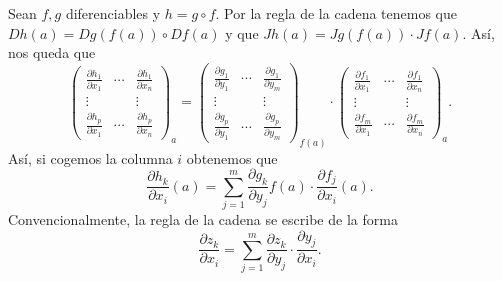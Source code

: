 \begin{observation}
Sean $\displaystyle f,g $ diferenciables y $\displaystyle h = g\circ f $. Por la regla de la cadena tenemos que $\displaystyle Dh\left(a\right)=Dg\left(f\left(a\right)\right)\circ Df\left(a\right) $ y que $\displaystyle Jh\left(a\right)=Jg\left(f\left(a\right)\right) \cdot Jf\left(a\right) $. Así, nos queda que
\[\begin{pmatrix} \frac{\partial h_{1}}{\partial x_{1}} & \cdots & \frac{\partial h_{1}}{\partial x_{n}} \\ \vdots & & \vdots \\ \frac{\partial h_{p}}{\partial x_{1}} & \cdots & \frac{\partial h_{p}}{\partial x_{n}} \end{pmatrix}_{a}= \begin{pmatrix} \frac{\partial g_{1}}{\partial y_{1}} & \cdots & \frac{\partial g_{1}}{\partial y_{m}} \\ \vdots & & \vdots \\ \frac{\partial g_{p}}{\partial y_{1}} & \cdots & \frac{\partial g_{p}}{\partial y_{m}} \end{pmatrix}_{f\left(a\right)}
\cdot \begin{pmatrix} \frac{\partial f_{1}}{\partial x_{1}} & \cdots & \frac{\partial f_{1}}{\partial x_{n}} \\ 
\vdots & & \vdots \\ 
\frac{\partial f_{m}}{\partial x_{1}} & \cdots & \frac{\partial f_{m}}{\partial x_{n}}\end{pmatrix}_{a}.\]
Así, si cogemos la columna $\displaystyle i $ obtenemos que 
\[\frac{\partial h_{k}}{\partial x_{i}}\left(a\right) = \sum^{m}_{j = 1}\frac{\partial g_{k}}{\partial y_{j}}f\left(a\right) \cdot \frac{\partial f_{j}}{\partial x_{i}}\left(a\right) .\]
Convencionalmente, la regla de la cadena se escribe de la forma
\[\frac{\partial z_{k}}{\partial x_{i}} = \sum^{m}_{ j= 1}\frac{\partial z_{k}}{\partial y_{j}} \cdot \frac{\partial y_{j}}{\partial x_{i}} .\]
\end{observation}
